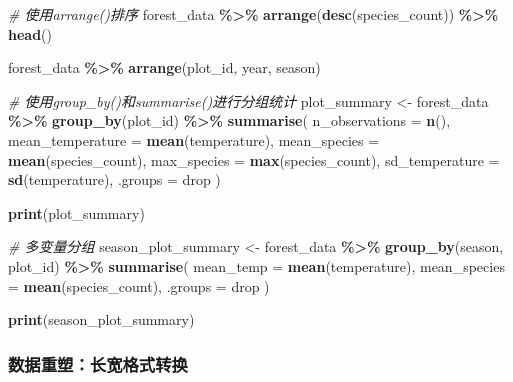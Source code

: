 \documentclass[
  twoside]{book}
\newenvironment{Shaded}{\begin{snugshade}}{\end{snugshade}}
\newcommand{\AttributeTok}[1]{\textcolor[rgb]{0.13,0.29,0.53}{#1}}
\newcommand{\CommentTok}[1]{\textcolor[rgb]{0.56,0.35,0.01}{\textit{#1}}}
\newcommand{\FunctionTok}[1]{\textcolor[rgb]{0.13,0.29,0.53}{\textbf{#1}}}
\newcommand{\NormalTok}[1]{#1}
\newcommand{\OtherTok}[1]{\textcolor[rgb]{0.56,0.35,0.01}{#1}}
\newcommand{\SpecialCharTok}[1]{\textcolor[rgb]{0.81,0.36,0.00}{\textbf{#1}}}
\newcommand{\StringTok}[1]{\textcolor[rgb]{0.31,0.60,0.02}{#1}}
\begin{document}
\begin{Shaded}
\begin{Highlighting}[]
\CommentTok{\# 使用arrange()排序}
\NormalTok{forest\_data }\SpecialCharTok{\%\textgreater{}\%}
  \FunctionTok{arrange}\NormalTok{(}\FunctionTok{desc}\NormalTok{(species\_count)) }\SpecialCharTok{\%\textgreater{}\%}
  \FunctionTok{head}\NormalTok{()}

\NormalTok{forest\_data }\SpecialCharTok{\%\textgreater{}\%}
  \FunctionTok{arrange}\NormalTok{(plot\_id, year, season)}

\CommentTok{\# 使用group\_by()和summarise()进行分组统计}
\NormalTok{plot\_summary }\OtherTok{\textless{}{-}}\NormalTok{ forest\_data }\SpecialCharTok{\%\textgreater{}\%}
  \FunctionTok{group\_by}\NormalTok{(plot\_id) }\SpecialCharTok{\%\textgreater{}\%}
  \FunctionTok{summarise}\NormalTok{(}
    \AttributeTok{n\_observations =} \FunctionTok{n}\NormalTok{(),}
    \AttributeTok{mean\_temperature =} \FunctionTok{mean}\NormalTok{(temperature),}
    \AttributeTok{mean\_species =} \FunctionTok{mean}\NormalTok{(species\_count),}
    \AttributeTok{max\_species =} \FunctionTok{max}\NormalTok{(species\_count),}
    \AttributeTok{sd\_temperature =} \FunctionTok{sd}\NormalTok{(temperature),}
    \AttributeTok{.groups =} \StringTok{\textquotesingle{}drop\textquotesingle{}}
\NormalTok{  )}

\FunctionTok{print}\NormalTok{(plot\_summary)}

\CommentTok{\# 多变量分组}
\NormalTok{season\_plot\_summary }\OtherTok{\textless{}{-}}\NormalTok{ forest\_data }\SpecialCharTok{\%\textgreater{}\%}
  \FunctionTok{group\_by}\NormalTok{(season, plot\_id) }\SpecialCharTok{\%\textgreater{}\%}
  \FunctionTok{summarise}\NormalTok{(}
    \AttributeTok{mean\_temp =} \FunctionTok{mean}\NormalTok{(temperature),}
    \AttributeTok{mean\_species =} \FunctionTok{mean}\NormalTok{(species\_count),}
    \AttributeTok{.groups =} \StringTok{\textquotesingle{}drop\textquotesingle{}}
\NormalTok{  )}

\FunctionTok{print}\NormalTok{(season\_plot\_summary)}
\end{Highlighting}
\end{Shaded}

\hypertarget{ux6570ux636eux91cdux5851ux957fux5bbdux683cux5f0fux8f6cux6362}{%
\subsubsection{数据重塑：长宽格式转换}\label{ux6570ux636eux91cdux5851ux957fux5bbdux683cux5f0fux8f6cux6362}}
\end{document}
